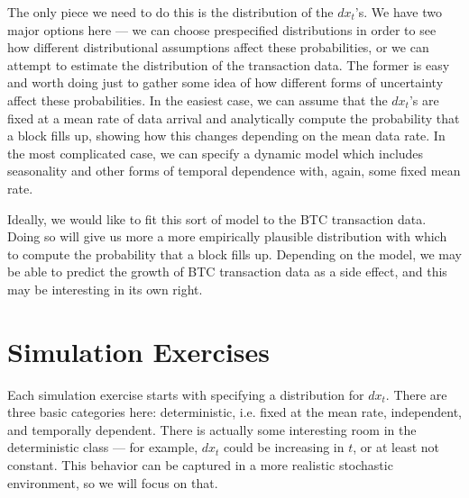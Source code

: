 \documentclass{article}
\begin{document}
The only piece we need to do this is the distribution of the $dx_t$'s. We have two major options here --- we can choose prespecified distributions in order to see how different distributional assumptions affect these probabilities, or we can attempt to estimate the distribution of the transaction data. The former is easy and worth doing just to gather some idea of how different forms of uncertainty affect these probabilities. In the easiest case, we can assume that the $dx_t$'s are fixed at a mean rate of data arrival and analytically compute the probability that a block fills up, showing how this changes depending on the mean data rate. In the most complicated case, we can specify a dynamic model which includes seasonality and other forms of temporal dependence with, again, some fixed mean rate.

Ideally, we would like to fit this sort of model to the BTC transaction data. Doing so will give us more a more empirically plausible distribution with which to compute the probability that a block fills up. Depending on the model, we may be able to predict the growth of BTC transaction data as a side effect, and this may be interesting in its own right.

\section{Simulation Exercises}

Each simulation exercise starts with specifying a distribution for $dx_t$. There are three basic categories here: deterministic, i.e. fixed at the mean rate, independent, and temporally dependent. There is actually some interesting room in the deterministic class --- for example, $dx_t$ could be increasing in $t$, or at least not constant. This behavior can be captured in a more realistic stochastic environment, so we will focus on that. 
\end{document}
